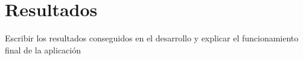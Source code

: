 \chapter{Resultados}
\label{ch:Resultados}

Escribir los resultados conseguidos en el desarrollo y explicar el funcionamiento final de la aplicación